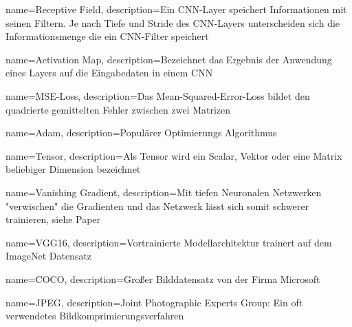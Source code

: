 {
	name={Receptive Field},
	description={Ein CNN-Layer speichert Informationen mit seinen Filtern. Je nach Tiefe und Stride des CNN-Layers unterscheiden sich die Informationsmenge die ein CNN-Filter speichert}
}

{
	name={Activation Map},
	description={Bezeichnet das Ergebnis der Anwendung eines Layers auf die Eingabedaten in einem CNN}
}

{
	name={MSE-Loss},
	description={Das Mean-Squared-Error-Loss bildet den quadrierte gemittelten Fehler zwischen zwei Matrizen}
}

{
	name={Adam},
	description={Populärer Optimierungs Algorithmus \cite{kingma2015adam}}
}


{
	name={Tensor},
	description={Als Tensor wird ein Scalar, Vektor oder eine Matrix beliebiger Dimension bezeichnet}
}

{
	name={Vanishing Gradient},
	description={Mit tiefen Neuronalen Netzwerken "verwischen" die Gradienten und das Netzwerk lässt sich somit schwerer trainieren, siehe Paper \cite{DBLP:journals/corr/HeZRS15}}
}

{
	name={VGG16},
	description={Vortrainierte Modellarchitektur trainert auf dem ImageNet Datensatz}
}

{
	name={COCO},
	description={Großer Bilddatensatz von der Firma Microsoft \cite{DBLP:journals/corr/LinMBHPRDZ14}}
}

{
	name={JPEG},
	description={Joint Photographic Experts Group: Ein oft verwendetes Bildkomprimierungsverfahren}
}
